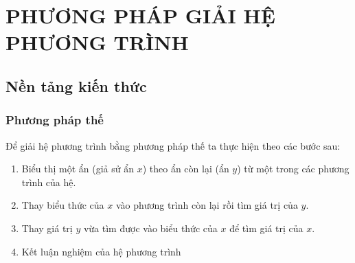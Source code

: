 
\section{PHƯƠNG PHÁP GIẢI HỆ PHƯƠNG TRÌNH}
\subsection{Nền tảng kiến thức}
\subsubsection{Phương pháp thế}
Để giải hệ phương trình bằng phương pháp thế ta thực hiện theo các bước sau:
\begin{enumerate}
	\item Biểu thị một ẩn (giả sử ẩn $x$) theo ẩn còn lại (ẩn $y$) từ một trong các phương trình của hệ.
	\item Thay biểu thức của $x$ vào phương trình còn lại rồi tìm giá trị của $y$.  
	\item Thay giá trị $y$ vừa tìm được vào biểu thức của $x$ để tìm giá trị của $x$.
	\item Kết luận nghiệm của hệ phương trình\end{enumerate}
